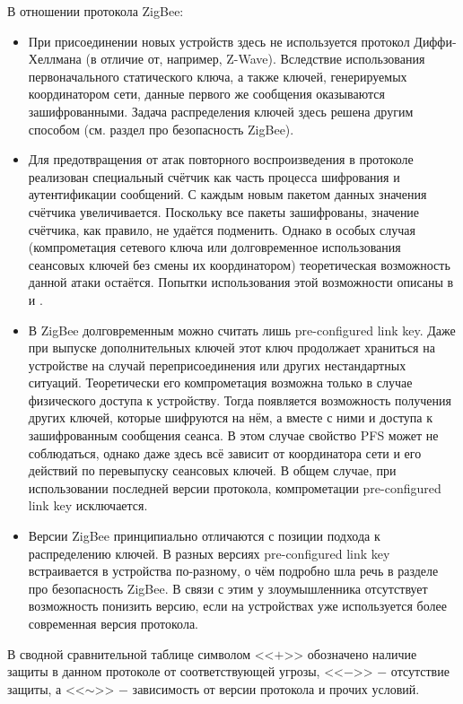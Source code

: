 	В отношении протокола ZigBee:
	
	\begin{itemize}
		\item При присоединении новых устройств здесь не используется протокол Диффи-Хеллмана
		(в отличие от, например, Z-Wave). Вследствие использования первоначального статического
		ключа, а также ключей, генерируемых координатором сети, данные первого же сообщения
		оказываются зашифрованными. Задача распределения ключей здесь решена другим способом
		(см. раздел про безопасность ZigBee).
		\item Для предотвращения от атак повторного воспроизведения в протоколе реализован
		специальный счётчик как часть процесса шифрования и аутентификации сообщений. С каждым
		новым пакетом данных значения счётчика увеличивается. Поскольку все пакеты зашифрованы,
		значение счётчика, как правило, не удаётся подменить. Однако в особых случая (компрометация
		сетевого ключа или долговременное использования сеансовых ключей без смены их координатором)
		теоретическая возможность данной атаки остаётся. Попытки использования этой возможности
		описаны в \cite{zigbee-attacks} и \cite{zigbee-security-analysis}.
		\item В ZigBee долговременным можно считать лишь pre-configured link key. Даже при выпуске 
		дополнительных ключей этот ключ продолжает храниться на устройстве на случай переприсоединения 
		или других нестандартных ситуаций. Теоретически его компрометация возможна только в случае
		физического доступа к устройству. Тогда появляется возможность получения других ключей,
		которые шифруются на нём, а вместе с ними и доступа к зашифрованным сообщения сеанса.
		В этом случае свойство PFS может не соблюдаться, однако даже здесь всё зависит от координатора
		сети и его действий по перевыпуску сеансовых ключей. В общем случае, при использовании последней
		версии протокола, компрометации pre-configured link key исключается.
		\item Версии ZigBee принципиально отличаются с позиции подхода к распределению ключей. В разных
		версиях pre-configured link key встраивается в устройства по-разному, о чём подробно шла речь
		в разделе про безопасность ZigBee. В связи с этим у злоумышленника отсутствует возможность
		понизить версию, если на устройствах уже используется более современная версия протокола.
	\end{itemize}

	В сводной сравнительной таблице символом <<$+$>> обозначено наличие защиты в данном протоколе
	от соответствующей угрозы, <<$-$>> $-$ отсутствие защиты, а <<$\sim$>> $-$ зависимость от версии
	протокола и прочих условий.
	
